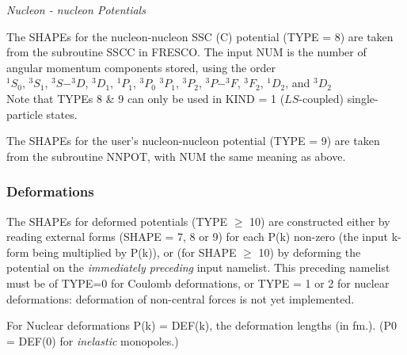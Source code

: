 \documentclass[11pt]{article}
\begin{document}
\bigskip
{\em Nucleon - nucleon Potentials}
\bigskip

The SHAPEs for the nucleon-nucleon SSC (C) potential (TYPE = 8) are
taken from the subroutine SSCC in FRESCO.
The input NUM is the number of angular momentum components stored,
using the order
\\
 $^1S_{0}$, $^3S_{1}$, $^3S-^3D$, $^3D_{1}$, $^1P_{1}$, $^3P_{0}$
$^3P_{1}$, $^3P_2$, $^3P-^3F$, $^3F_2$, $^1D_2$, and $^3D_2$
\\
Note that TYPEs 8 \& 9 can only be used in KIND = 1 ($LS$-coupled)
single-particle states.


The SHAPEs for the user's nucleon-nucleon potential (TYPE = 9) are
taken from the subroutine NNPOT, with NUM the same meaning as above.

\subsubsection{Deformations}


The SHAPEs for deformed potentials (TYPE $\geq$ 10) are constructed either
by reading external forms (SHAPE = 7, 8 or 9) for each P(k) non-zero
(the input k-form being multiplied by P(k)),
or (for SHAPE $\geq$ 10) by deforming the potential on the
{\em immediately preceding} input namelist.
This preceding namelist must be of TYPE=0 for Coulomb deformations,
or TYPE = 1 or 2 for nuclear deformations: deformation of non-central
forces is not yet implemented.
\bigskip

For Nuclear deformations P(k) = DEF(k), the deformation lengths (in fm.).
(P0 = DEF(0) for {\em inelastic} monopoles.)
%
\end{document}
